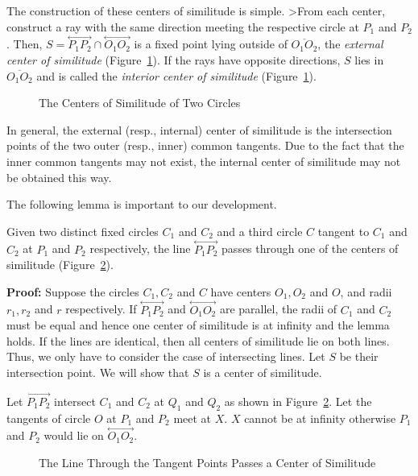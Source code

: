        The construction of these centers of similitude is simple.
>From each center, construct a ray with the same direction meeting the 
respective circle at $P_1$ and $P_2$.  Then, 
$S=\stackrel{\longleftrightarrow}{P_1P_2}\cap
\stackrel{\longleftrightarrow}{O_1O_2}$ is a fixed point lying outside
of $\overline{O_1O_2}$, the {\em external center of similitude} 
(Figure~\ref{fig:similitude-centers}).
If the rays have opposite directions, $S$ lies in $\overline{O_1O_2}$
and is called the {\em interior center of similitude} 
(Figure~\ref{fig:similitude-centers}).
\begin{figure}
\vspace{3.5cm}
\caption{The Centers of Similitude of Two Circles}
\label{fig:similitude-centers}
\end{figure}

     In general, the external (resp., internal) center of similitude is the 
intersection points of the two outer (resp., inner) common tangents.
Due to the fact that the inner common tangents may not exist, the 
internal center of similitude may not be obtained this way.

     The following lemma is important to our development. 

\begin{lemma}
\label{lemma:tangent-center}
     Given two distinct fixed circles $C_1$ and $C_2$ and a third circle $C$
tangent to $C_1$ and $C_2$ at $P_1$ and $P_2$ respectively, the line 
$\stackrel{\longleftrightarrow}{P_1P_2}$ passes through one of the centers of
similitude (Figure~\ref{fig:tangent-center}).
\end{lemma}
{\bf Proof:}  Suppose the circles $C_1,C_2$ and $C$ have centers $O_1,O_2$ 
and $O$, and radii $r_1,r_2$ and $r$ respectively.
If $\stackrel{\longleftrightarrow}{P_1P_2}$ and
$\stackrel{\longleftrightarrow}{O_1O_2}$ are parallel, the radii of $C_1$ and
$C_2$ must be equal and hence one center of similitude is at infinity and 
the lemma holds.  If the lines are identical, then all centers of similitude
lie on both lines.  Thus, we only have to consider the case of intersecting
lines.  Let $S$ be their intersection point.   
We will show that $S$ is a center of similitude.

     Let $\stackrel{\longleftrightarrow}{P_1P_2}$ intersect $C_1$ and $C_2$
at $Q_1$ and $Q_2$ as shown in Figure~\ref{fig:tangent-center}.  
Let the tangents of circle $O$ at $P_1$ and $P_2$ meet at $X$.  $X$ cannot be 
at infinity otherwise $P_1$ and $P_2$ would lie on 
$\stackrel{\longleftrightarrow}{O_1O_2}$.
\begin{figure}
\vspace{4.5cm}
\caption{The Line Through the Tangent Points Passes a Center of Similitude}
\label{fig:tangent-center}
\end{figure}

